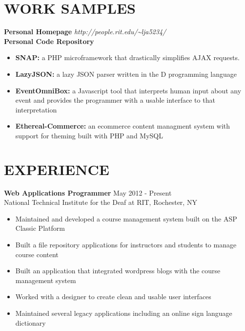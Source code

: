 \documentclass[line,margin]{res}
\begin{document}
\begin{resume}
 
\section{WORK SAMPLES} 
\vspace{-2ex}
\begin{tabbing}
{\bf Personal Homepage} \hspace{.5in}   \= {\sl http://people.rit.edu/\textasciitilde{}lja5234/} \\
{\bf Personal Code Repository}	
\end{tabbing}
  \begin{itemize}  \itemsep -2pt %
\item {\bf SNAP:} a PHP microframework that drastically simplifies AJAX requests.
\item {\bf LazyJSON:} a lazy JSON parser written in the D programming language
\item {\bf EventOmniBox:} a Javascript tool that interprets human input about any event and provides the programmer with a usable interface to that interpretation
\item {\bf Ethereal-Commerce:} an ecommerce content managment system with support for theming built with PHP and MySQL
\end{itemize}




 
 
\section{EXPERIENCE} {\bf Web Applications Programmer} \hfill May 2012 - Present \\
               National Technical Institute for the Deaf at RIT, 
               Rochester, NY
               
                 \begin{itemize}  \itemsep -2pt %
                 \item Maintained and developed a course management system built on the ASP Classic Platform
                 \item Built a file repository applications for instructors and students to manage course content
                 \item Built an application that integrated wordpress blogs with the course management system
                 \item Worked with a designer to create clean and usable user interfaces
                 \item Maintained several legacy applications including an online sign language dictionary
                \end{itemize}
 

\end{resume}
\end{document}
